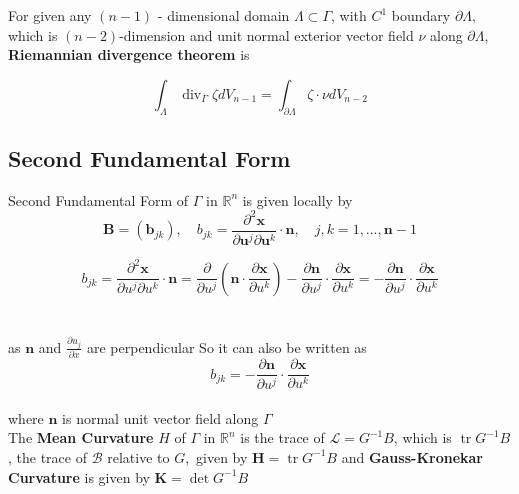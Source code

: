 \documentclass[oneside]{book}
\begin{document}
	
	
	
	
	
	For given any $(n-1)$ - dimensional domain $\Lambda \subset \Gamma$,  with $C^{1}$ boundary $\partial \Lambda,$ which is $(n-2)$-dimension and unit normal exterior vector field $\nu$ along $\partial \Lambda$, \textbf{Riemannian divergence theorem} is 
	
	\begin{equation}
	\label{eq20}  
	\int_{\Lambda} \operatorname{div}_{\Gamma} \zeta d V_{n-1}=\int_{\partial \Lambda} \zeta \cdot \nu d V_{n-2}
	\end{equation}
	
	
	\subsection{Second Fundamental Form}
	\label{ss:14} Second Fundamental Form of $\Gamma$ in $\mathbb{R}^{n}$ is given locally by 
	\begin{equation}
	\label{eq21}  
	\boldsymbol{B}=\left(\boldsymbol{b}_{j k}\right), \quad b_{j k}=\frac{\partial^{2} \mathbf{x}}{\partial \boldsymbol{u}^{j} \partial \boldsymbol{u}^{k}} \cdot \mathbf{n}, \quad j, k=1, \ldots, \boldsymbol{n}-1 
	\end{equation}
	
	$$b_{j k}=\frac{\partial^{2} \mathbf{x}}{\partial u^{j} \partial u^{k}} \cdot \mathbf{n}=\frac{\partial}{\partial u^{j}}\left(\mathbf{n} \cdot \frac{\partial \mathbf{x}}{\partial u^{k}}\right)-\frac{\partial \mathbf{n}}{\partial u^{j}} \cdot \frac{\partial \mathbf{x}}{\partial u^{k}}=-\frac{\partial \mathbf{n}}{\partial u^{j}} \cdot \frac{\partial \mathbf{x}}{\partial u^{k}}$$ \\\\
	
	
	as $\boldsymbol{n}$ and $\frac{\partial u_{j}}{\partial x} $ are perpendicular
	So it can also be written as 
	\begin{equation}
	\label{eq22}  
	b_{j k} = -\frac{\partial \mathbf{n}}{\partial u^{j}} \cdot \frac{\partial \mathbf{x}}{\partial u^{k}}         \end{equation} \\
	where $\mathbf{n}$ is normal unit vector field along $\Gamma$ \\
	
	
	The \textbf{Mean Curvature} $H$ of $\Gamma$ in $\mathbb{R}^{n}$ is the trace of $\mathcal{L} = G^{-1} B$, which is $\operatorname{tr} G^{-1} B$, the trace of $\mathcal{B}$ relative
	to $G,$ given by
	$
	\boldsymbol{H}=\operatorname{tr} G^{-1} B
	$ and \textbf{Gauss-Kronekar Curvature} is given by $\boldsymbol{K}=\operatorname{det} {G}^{-1} {B}$
	
\end{document}
